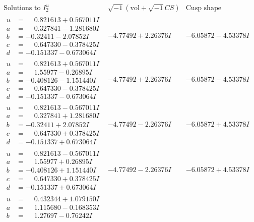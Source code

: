 \documentclass[1p]{elsarticle_modified}
\theoremstyle{definition}
\newcommand{\I}{\sqrt{-1}}
\begin{document}
$$\begin{array}{c|c|c}  
\text{Solutions to }I^u_{2}& \I (\text{vol} + \sqrt{-1}CS) & \text{Cusp shape}\\
 \hline 
\begin{aligned}
u &= \phantom{-}0.821613 + 0.567011 I \\
a &= \phantom{-}0.327841 - 1.281680 I \\
b &= -0.32411 - 2.07852 I \\
c &= \phantom{-}0.647330 - 0.378425 I \\
d &= -0.151337 - 0.673064 I\end{aligned}
 & -4.77492 + 2.26376 I & -6.05872 - 4.53378 I \\ \hline\begin{aligned}
u &= \phantom{-}0.821613 + 0.567011 I \\
a &= \phantom{-}1.55977 - 0.26895 I \\
b &= -0.408126 - 1.151440 I \\
c &= \phantom{-}0.647330 - 0.378425 I \\
d &= -0.151337 - 0.673064 I\end{aligned}
 & -4.77492 + 2.26376 I & -6.05872 - 4.53378 I \\ \hline\begin{aligned}
u &= \phantom{-}0.821613 - 0.567011 I \\
a &= \phantom{-}0.327841 + 1.281680 I \\
b &= -0.32411 + 2.07852 I \\
c &= \phantom{-}0.647330 + 0.378425 I \\
d &= -0.151337 + 0.673064 I\end{aligned}
 & -4.77492 - 2.26376 I & -6.05872 + 4.53378 I \\ \hline\begin{aligned}
u &= \phantom{-}0.821613 - 0.567011 I \\
a &= \phantom{-}1.55977 + 0.26895 I \\
b &= -0.408126 + 1.151440 I \\
c &= \phantom{-}0.647330 + 0.378425 I \\
d &= -0.151337 + 0.673064 I\end{aligned}
 & -4.77492 - 2.26376 I & -6.05872 + 4.53378 I \\ \hline\begin{aligned}
u &= \phantom{-}0.432344 + 1.079150 I \\
a &= \phantom{-}1.115680 - 0.168353 I \\
b &= \phantom{-}1.27697 - 0.76242 I \\

\end{aligned}
\end{array}$$
\end{document}
